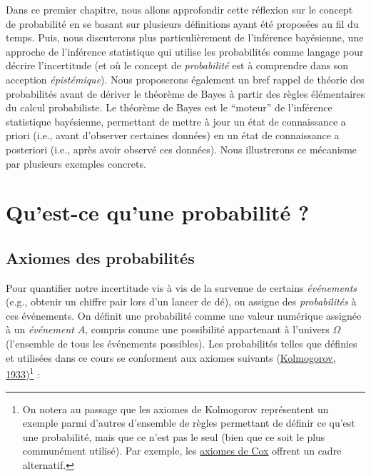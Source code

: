 \documentclass[
  a4paper,11pt,twoside,onecolumn,openright,final,oldfontcommands]{memoir}
\theoremstyle{definition}
\theoremstyle{definition}
\theoremstyle{definition}
\theoremstyle{definition}
\theoremstyle{remark}
\begin{document}
Dans ce premier chapitre, nous allons approfondir cette réflexion sur le concept de probabilité en se basant sur plusieurs définitions ayant été proposées au fil du temps. Puis, nous discuterons plus particulièrement de l'inférence bayésienne, une approche de l'inférence statistique qui utilise les probabilités comme langage pour décrire l'incertitude (et où le concept de \emph{probabilité} est à comprendre dans son acception \emph{épistémique}). Nous proposerons également un bref rappel de théorie des probabilités avant de dériver le théorème de Bayes à partir des règles élémentaires du calcul probabiliste. Le théorème de Bayes est le ``moteur'' de l'inférence statistique bayésienne, permettant de mettre à jour un état de connaissance a priori (i.e., avant d'observer certaines données) en un état de connaissance a posteriori (i.e., après avoir observé ces données). Nous illustrerons ce mécanisme par plusieurs exemples concrets.

\hypertarget{quest-ce-quune-probabilituxe9}{%
\section{Qu'est-ce qu'une probabilité ?}\label{quest-ce-quune-probabilituxe9}}

\hypertarget{axiomes-des-probabilituxe9s}{%
\subsection{Axiomes des probabilités}\label{axiomes-des-probabilituxe9s}}

Pour quantifier notre incertitude vis à vis de la survenue de certains \emph{événements} (e.g., obtenir un chiffre pair lors d'un lancer de dé), on assigne des \emph{probabilités} à ces événements. On définit une probabilité comme une valeur numérique assignée à un \emph{événement} \(A\), compris comme une possibilité appartenant à l'univers \(\Omega\) (l'ensemble de tous les événements possibles). Les probabilités telles que définies et utilisées dans ce cours se conforment aux axiomes suivants (\protect\hyperlink{ref-kolmogorov_foundations_1933}{Kolmogorov, 1933})\footnote{On notera au passage que les axiomes de Kolmogorov représentent un exemple parmi d'autres d'ensemble de règles permettant de définir ce qu'est une probabilité, mais que ce n'est pas le seul (bien que ce soit le plus communément utilisé). Par exemple, les \href{https://en.wikipedia.org/wiki/Cox\%27s_theorem}{axiomes de Cox} offrent un cadre alternatif.} :
\end{document}
